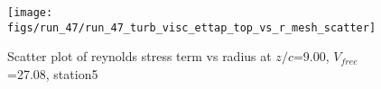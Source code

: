\begin{figure}[H]
\centering
\texttt{[image: figs/run\_47/run\_47\_turb\_visc\_ettap\_top\_vs\_r\_mesh\_scatter]}
\caption{Scatter plot of reynolds stress term vs radius at $z/c$=9.00, $V_{free}$=27.08, station5}
\label{fig:run_47_turb_visc_ettap_top_vs_r_mesh_scatter}
\end{figure}


